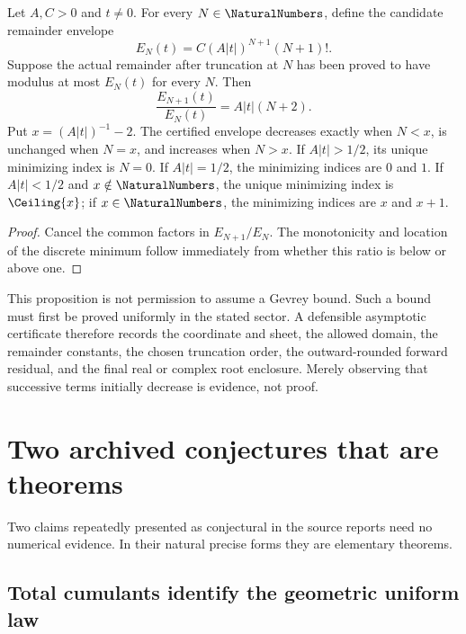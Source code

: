 \begin{proposition}
\label{prop:gevrey-least-term}
Let \(A,C>0\) and \(t\ne0\).  For every \(N\in\NaturalNumbers\), define the candidate
remainder envelope
\[
 E_N(t)=C(A\lvert t\rvert)^{N+1}(N+1)!.
\]
Suppose the actual remainder after truncation at \(N\) has been proved to
have modulus at most \(E_N(t)\) for every \(N\).  Then
\[
 \frac{E_{N+1}(t)}{E_N(t)}=A\lvert t\rvert(N+2).
\]
Put \(x=(A\lvert t\rvert)^{-1}-2\).  The certified envelope decreases
exactly when \(N<x\), is unchanged when \(N=x\), and increases when \(N>x\).
If \(A\lvert t\rvert>1/2\), its unique minimizing index is \(N=0\).  If
\(A\lvert t\rvert=1/2\), the minimizing indices are \(0\) and \(1\).  If
\(A\lvert t\rvert<1/2\) and \(x\notin\NaturalNumbers\), the unique minimizing index is
\(\Ceiling{x}\); if \(x\in\NaturalNumbers\), the minimizing indices are \(x\) and
\(x+1\).
\end{proposition}

\begin{proof}
Cancel the common factors in \(E_{N+1}/E_N\).  The monotonicity and location of
the discrete minimum follow immediately from whether this ratio is below or
above one.
\end{proof}

This proposition is not permission to assume a Gevrey bound.  Such a bound
must first be proved uniformly in the stated sector.  A defensible asymptotic
certificate therefore records the coordinate and sheet, the allowed domain,
the remainder constants, the chosen truncation order, the outward-rounded
forward residual, and the final real or complex root enclosure.  Merely
observing that successive terms initially decrease is evidence, not proof.

\section{Two archived conjectures that are theorems}
\label{sec:upgraded-conjectures}

Two claims repeatedly presented as conjectural in the source reports need no
numerical evidence.  In their natural precise forms they are elementary
theorems.

\subsection{Total cumulants identify the geometric uniform law}

